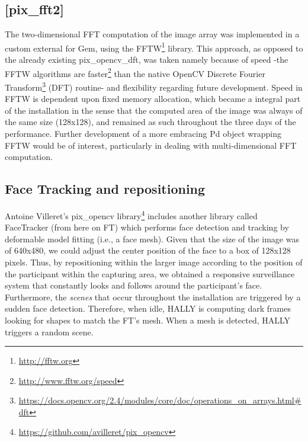 \documentclass{nime-alternate}
\begin{document}
\subsection{[pix\_fft2]}
\label{sec:2dfft}
The two-dimensional FFT computation of the image array was implemented in a custom external for Gem\cite{danks:gem}, using the FFTW\footnote{\url{http://fftw.org}} library. This approach, as opposed to the already existing pix\_opencv\_dft, was taken namely because of speed -the FFTW algorithms are faster\footnote{\url{http://www.fftw.org/speed}} than the native OpenCV Discrete Fourier Transform\footnote{\url{https://docs.opencv.org/2.4/modules/core/doc/operations_on_arrays.html\#dft}} (DFT) routine- and flexibility regarding future development. Speed in FFTW is dependent upon fixed memory allocation, which became a integral part of the installation in the sense that the computed area of the image was always of the same size (128x128), and remained as such throughout the three days of the performance. Further development of a more embracing Pd object wrapping FFTW would be of interest, particularly in dealing with multi-dimensional FFT computation. 

\subsection{Face Tracking and repositioning}
\label{sec:facetracking}
Antoine Villeret's pix\_opencv library\footnote{\url{https://github.com/avilleret/pix\_opencv}} includes another library called FaceTracker\cite{sarahig:facetracker}  (from here on FT) which performs face detection and tracking by deformable model fitting (i.e., a face mesh). Given that the  size of the image was of 640x480, we could adjust the center position of the face to a box of 128x128 pixels. Thus, by repositioning within the larger image according to the position of the participant within the capturing area, we obtained a responsive surveillance system that constantly looks and follows around the participant's face. Furthermore, the \textit{scenes} that occur throughout the installation are triggered by a sudden face detection. Therefore, when idle, HALLY is computing dark frames looking for shapes to match the FT's mesh. When a mesh is detected, HALLY triggers a random scene.
\end{document}
